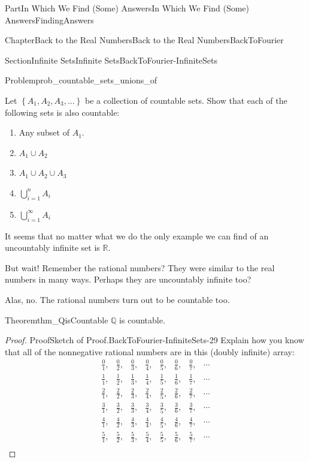 \documentclass[oneside,10pt,]{book}
\numberwithin{equation}{part}
\newcommand{\RR}{\mathbb {R}}
\newcommand{\QQ}{\mathbb {Q}}
\newcommand{\amp}{&}
\begin{document}
\begin{partptx}{Part}{In Which We Find (Some) Answers}{}{In Which We Find (Some) Answers}{}{}{FindingAnswers}
\begin{chapterptx}{Chapter}{Back to the Real Numbers}{}{Back to the Real Numbers}{}{}{BackToFourier}
\begin{sectionptx}{Section}{Infinite Sets}{}{Infinite Sets}{}{}{BackToFourier-InfiniteSets}
\begin{problem}{Problem}{}{prob_countable_sets_unions_of}
 \par
Let \(\left\{A_1, A_2, A_3, \ldots \right\}\) be a collection of countable sets.  Show that each of the following sets is also countable:%
\begin{enumerate}[font=\bfseries,label=(\alph*),ref=\alph*]%
\item{}Any subset of \(A_1\).%
\item{}\(A_1\cup A_2\)%
\item{}\(A_1\cup A_2 \cup A_3\)%
\item{}\(\displaystyle\bigcup_{i=1}^nA_i\)%
\item{}\(\displaystyle\bigcup_{i=1}^\infty A_i\)%
\end{enumerate}%
\end{problem}
It seems that no matter what we do the only example we can find of an uncountably infinite set is \(\RR\).%
\par
But wait!  Remember the rational numbers?  They were similar to the real numbers in many ways.  Perhaps they are uncountably infinite too?%
\par
Alas, no.  The rational numbers turn out to be countable too.%
\begin{theorem}{Theorem}{}{}{thm_QisCountable}%
\index{\(\QQ\)!is countable}%
\(\QQ\) is countable.%
\end{theorem}
\begin{proof}{Proof}{Sketch of Proof.}{BackToFourier-InfiniteSets-29}
Explain how you know that all of the non\textendash{}negative rational numbers are in this (doubly infinite) array:%
\begin{equation*}
\begin{array}{cccccccc}
\frac01,\amp{}\frac02,\amp{}\frac03,\amp{}\frac04,\amp{}\frac05,\amp{}\frac06,\amp{}\frac07,\amp{}\cdots\\
\frac11,\amp{}\frac12,\amp{}\frac13,\amp{}\frac14,\amp{}\frac15,\amp{}\frac16,\amp{}\frac17,\amp{}\cdots\\
\frac21,\amp{}\frac22,\amp{}\frac23,\amp{}\frac24,\amp{}\frac25,\amp{}\frac26,\amp{}\frac27,\amp{}\cdots\\
\frac31,\amp{}\frac32,\amp{}\frac33,\amp{}\frac34,\amp{}\frac35,\amp{}\frac36,\amp{}\frac37,\amp{}\cdots\\
\frac41,\amp{}\frac42,\amp{}\frac43,\amp{}\frac44,\amp{}\frac45,\amp{}\frac46,\amp{}\frac47,\amp{}\cdots\\
\frac51,\amp{}\frac52,\amp{}\frac53,\amp{}\frac54,\amp{}\frac55,\amp{}\frac56,\amp{}\frac57,\amp{}\cdots\\

\end{array}
\end{equation*}
\end{proof}
\end{sectionptx}
\end{chapterptx}
\end{partptx}
\end{document}
